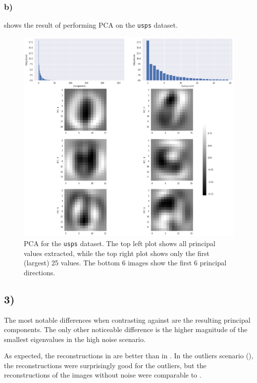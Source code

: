 \documentclass[a4paper,11pt]{article}
\begin{document}
\subsubsection*{b)}

 shows the result of performing PCA on the \verb|usps| dataset.

\begin{figure}
  \centering
  \includegraphics[width=\textwidth]{images/assignment5-2-b-abc.png}
  \caption{PCA for the \texttt{usps}  dataset. The top left plot shows all principal values extracted, while the top right plot shows only the first (largest) 25 values. The bottom 6 images show the first 6 principal directions.}
  \label{fig:assignment5-2-b-abc}
\end{figure}

\subsection*{3)}

The most notable differences when contrasting  against  are the resulting principal components. The only other noticeable difference is the higher magnitude
of the smallest eigenvalues in the high noise scenario.

As expected, the reconstructions in  are better than in . In the outliers scenario (),
the reconstructions were surprisingly good for the outliers, but the reconstructions
of the images without noise were comparable to .
\end{document}
